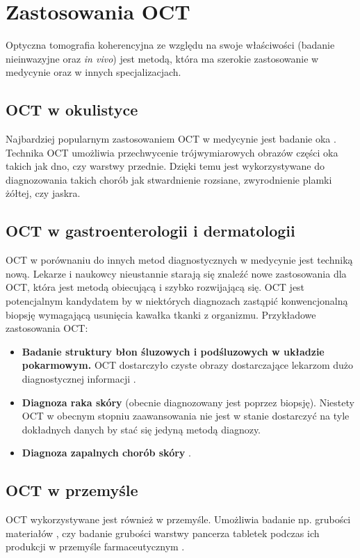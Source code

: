 
\section{Zastosowania OCT}
\label{sec:obrazowanie_oct:zastosowania_oct}

Optyczna tomografia koherencyjna ze względu na swoje właściwości (badanie nieinwazyjne oraz \textit{in vivo}) jest metodą, która ma szerokie zastosowanie w medycynie oraz w innych specjalizacjach.

\subsection{OCT w okulistyce}

Najbardziej popularnym zastosowaniem OCT w medycynie jest badanie oka \cite{Fercher03}. Technika OCT umożliwia przechwycenie trójwymiarowych obrazów części oka takich jak dno, czy warstwy przednie. Dzięki temu jest wykorzystywane do diagnozowania takich chorób jak stwardnienie rozsiane, zwyrodnienie plamki żółtej, czy jaskra.

\subsection{OCT w gastroenterologii i dermatologii}

OCT w porównaniu do innych metod diagnostycznych w medycynie jest techniką nową. Lekarze i naukowcy nieustannie starają się znaleźć nowe zastosowania dla OCT, która jest metodą obiecującą i szybko rozwijającą się. OCT jest potencjalnym kandydatem by w niektórych diagnozach zastąpić konwencjonalną biopsję wymagającą usunięcia kawałka tkanki z organizmu. Przykładowe zastosowania OCT:

\begin{itemize}
\item \textbf{Badanie struktury błon śluzowych i podśluzowych w układzie pokarmowym.} OCT dostarczyło czyste obrazy dostarczające lekarzom dużo diagnostycznej informacji \cite{Rollins:99}.
\item \textbf{Diagnoza raka skóry} (obecnie diagnozowany jest poprzez biopsję). Niestety OCT w obecnym stopniu zaawansowania nie jest w stanie dostarczyć na tyle dokładnych danych by stać się jedyną metodą diagnozy.
\item \textbf{Diagnoza zapalnych chorób skóry} \cite{Welzel01}.
\end{itemize}

\subsection{OCT w przemyśle}

OCT wykorzystywane jest również w przemyśle. Umożliwia badanie np. grubości materiałów \cite{walecki2006determining}, czy badanie grubości warstwy pancerza tabletek podczas ich produkcji w przemyśle farmaceutycznym \cite{markl2014device}.
